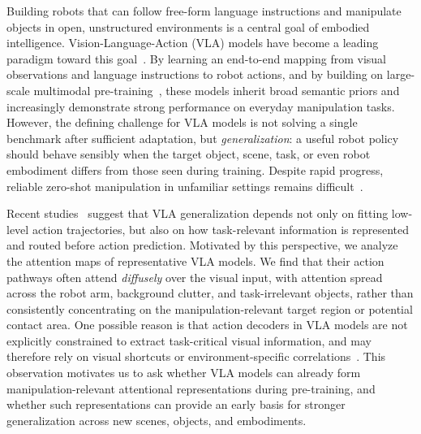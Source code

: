 \documentclass[a4paper,table]{extarticle}
\begin{document}
Building robots that can follow free-form language instructions and manipulate objects in open, unstructured environments is a central goal of embodied intelligence. Vision-Language-Action (VLA) models have become a leading paradigm toward this goal~\cite{rt2_2023,openvla_2024,octo_2024,pi0_2026,rdt1b_2024,spatialvla_2025,gr00tn1_2025}. By learning an end-to-end mapping from visual observations and language instructions to robot actions, and by building on large-scale multimodal pre-training~\cite{openx_2024,droid_2024,pi05_2025,lap_2026}, these models inherit broad semantic priors and increasingly demonstrate strong performance on everyday manipulation tasks. However, the defining challenge for VLA models is not solving a single benchmark after sufficient adaptation, but \emph{generalization}: a useful robot policy should behave sensibly when the target object, scene, task, or even robot embodiment differs from those seen during training. Despite rapid progress, reliable zero-shot manipulation in unfamiliar settings remains difficult~\cite{openvla_2024,pi05_2025,dreamzero_2026,lap_2026}. 

Recent studies~\cite{pi05_2025,lap_2026,goalvla_2026} suggest that VLA generalization depends not only on fitting low-level action trajectories, but also on how task-relevant information is represented and routed before action prediction. Motivated by this perspective, we analyze the attention maps of representative VLA models. We find that their action pathways often attend \emph{diffusely} over the visual input, with attention spread across the robot arm, background clutter, and task-irrelevant objects, rather than consistently concentrating on the manipulation-relevant target region or potential contact area. One possible reason is that action decoders in VLA models are not explicitly constrained to extract task-critical visual information, and may therefore rely on visual shortcuts or environment-specific correlations~\cite{guidedvla_2026}. This observation motivates us to ask whether VLA models can already form manipulation-relevant attentional representations during pre-training, and whether such representations can provide an early basis for stronger generalization across new scenes, objects, and embodiments.
\end{document}
